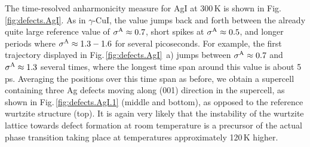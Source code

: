 %
The time-resolved anharmonicity measure for AgI at 300\,K is shown in Fig.\,\ref{fig:defects.AgI}. As in $\gamma$-CuI, the value jumps back and forth between the already quite large reference value of $\sigma^\mathrm{A} \approx 0.7$, short spikes at $\sigma^\mathrm{A} \approx 0.5$, and longer periods where $\sigma^\mathrm{A} \approx 1.3-1.6$ for several picoseconds. For example, the first trajectory displayed in Fig.\,\ref{fig:defects.AgI}~a) jumps between $\sigma^\mathrm{A} \approx 0.7$ and $\sigma^\mathrm{A} \approx 1.3$ several times, where the longest time span around this value is about 5\,ps. Averaging the positions over this time span as before, we obtain a supercell containing three Ag defects moving along (001) direction in the supercell, as shown in Fig.\,\ref{fig:defects.AgI.1} (middle and bottom), as opposed to the reference wurtzite structure (top).
It is again very likely that the instability of the wurtzite lattice towards defect formation at room temperature is a precursor of the actual phase transition taking place at temperatures approximately 120\,K higher. 

\newpage
